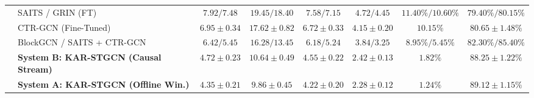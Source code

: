 \documentclass[10pt,twocolumn]{article}
\begin{document}
\begin{table}[!t]
{\begin{tabular}{llcccccc}
& SAITS \cite{du2023saits} / GRIN \cite{cini2022filling} (FT) & $7.92 / 7.48$ & $19.45 / 18.40$ & $7.58 / 7.15$ & $4.72 / 4.45$ & $11.40\% / 10.60\%$ & $79.40\% / 80.15\%$ \\
& CTR-GCN \cite{chen2021channel} (Fine-Tuned) & $6.95 \pm 0.34$ & $17.62 \pm 0.82$ & $6.72 \pm 0.33$ & $4.15 \pm 0.20$ & $10.15\%$ & $80.65 \pm 1.48\%$ \\
& BlockGCN \cite{zhou2024blockgcn} / SAITS + CTR-GCN & $6.42 / 5.45$ & $16.28 / 13.45$ & $6.18 / 5.24$ & $3.84 / 3.25$ & $8.95\% / 5.45\%$ & $82.30\% / 85.40\%$ \\
& \textbf{System B: KAR-STGCN (Causal Stream)} & $4.72 \pm 0.23$ & $10.64 \pm 0.49$ & $4.55 \pm 0.22$ & $2.42 \pm 0.13$ & $1.82\%$ & $88.25 \pm 1.22\%$ \\
& \textbf{System A: KAR-STGCN (Offline Win.)} & $\mathbf{4.35 \pm 0.21}$ & $\mathbf{9.86 \pm 0.45}$ & $\mathbf{4.22 \pm 0.20}$ & $\mathbf{2.28 \pm 0.12}$ & $\mathbf{1.24\%}$ & $\mathbf{89.12 \pm 1.15\%}$ \\
\bottomrule
\end{tabular}
}
\end{table}
\end{document}
